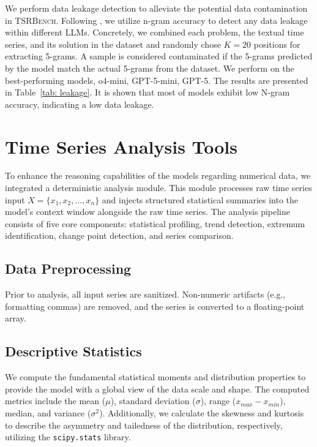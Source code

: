 \documentclass{article}
\theoremstyle{plain}
\theoremstyle{definition}
\theoremstyle{remark}
\newcommand\ours{\textsc{TSRBench}\xspace}
\theoremstyle{plain}
\begin{document}
We perform data leakage detection to alleviate the potential data contamination in \ours. Following \citep{xu2024benchmarking}, we utilize n-gram accuracy to detect any data leakage within different LLMs. Concretely, we combined each problem, the textual time series, and its solution in the dataset and randomly chose $K=20$ positions for extracting 5-grams. A sample is considered contaminated if the 5-grams predicted by the model match the actual 5-grams from the dataset. We perform on the best-performing models, o4-mini, GPT-5-mini, GPT-5. The results are presented in Table~\ref{tab: leakage}. It is shown that most of models exhibit low N-gram accuracy, indicating a low data leakage.

\section{Time Series Analysis Tools}
\label{appendix:timeseries-analysis}

To enhance the reasoning capabilities of the models regarding numerical data, we integrated a deterministic analysis module. This module processes raw time series input $X = \{x_1, x_2, \dots, x_n\}$ and injects structured statistical summaries into the model's context window alongside the raw time series. The analysis pipeline consists of five core components: statistical profiling, trend detection, extremum identification, change point detection, and series comparison.

\subsection{Data Preprocessing}
Prior to analysis, all input series are sanitized. Non-numeric artifacts (e.g., formatting commas) are removed, and the series is converted to a floating-point array.

\subsection{Descriptive Statistics}
We compute the fundamental statistical moments and distribution properties to provide the model with a global view of the data scale and shape. The computed metrics include the mean ($\mu$), standard deviation ($\sigma$), range ($x_{max} - x_{min}$), median, and variance ($\sigma^2$). Additionally, we calculate the skewness and kurtosis to describe the asymmetry and tailedness of the distribution, respectively, utilizing the \texttt{scipy.stats} library.
\end{document}
